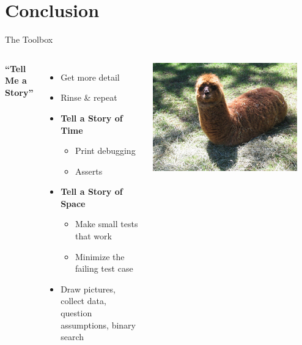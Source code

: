\documentclass[xcolor=dvipsnames]{beamer}
\begin{document}
\section{Conclusion}


\begin{frame}{The Toolbox}
	\begin{columns}[l]
	\textbf{``Tell Me a Story''}
	\begin{itemize}
		\item Get more detail
		\item Rinse \& repeat
		\pause
		\item {\bf Tell a Story of Time}
		\begin{itemize}
			\item Print debugging
			\item Asserts
		\end{itemize}
		\pause
		\item {\bf Tell a Story of Space}
		\begin{itemize}
			\item Make small tests that work
			\item Minimize the failing test case
		\end{itemize}
		\pause
		\item Draw pictures, collect data, question assumptions, binary search
	\end{itemize}
	\pause
	\begin{center}
		\includegraphics[width=0.9\textwidth]{vip1066720.jpg}
	\end{center}
	\end{columns}
\end{frame}
\end{document}
